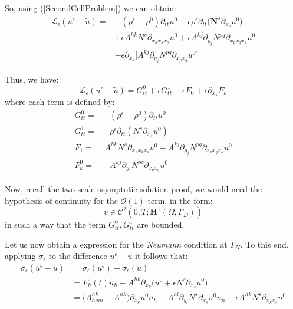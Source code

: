 So, using (\ref{SecondCellProblem}) we can obtain:
\begin{align*}
    \mathcal{L}_{\epsilon} (u^{\epsilon} -\tilde{u})  = & - (\rho^{\epsilon}-\rho^0) \partial_{tt} u^0 - \epsilon \rho^{\epsilon} \partial_{tt}\big(\mathbf{N}^s \partial_{x_s}u^0 \big)  \\
    & + \epsilon A^{hk} N^s \partial_{x_h x_k x_s} u^0 + \epsilon A^{kj} \partial_{y_j} N^{pq} \partial_{x_p x_q x_k} u^0  \\
    & - \epsilon \partial_{x_k} \big[ A^{kj} \partial_{y_j} N^{pq} \partial_{x_p x_q} u^0\big] 
\end{align*}

Thus, we have:
\begin{equation}
    \mathcal{L}_{\epsilon} (u^{\epsilon}-\tilde{u}) = G_{tt}^0 + \epsilon G_{tt}^1 + \epsilon F_0 + \epsilon \partial_{x_k} F_k
\end{equation}
where each term is defined by:
\begin{equation}
    \label{Variables}
    \begin{aligned}
        G_{tt}^0 = & -(\rho^{\epsilon} - \rho^0) \partial_{tt}u^0 \\
        G_{tt}^1 = & -\rho^{\epsilon} \partial_{tt}(N^s \partial_{x_s} u^0) \\
        F_1 = & \, A^{hk}N^s \partial_{x_h x_k x_s} u^0  + A^{kj}\partial_{y_j} N^{pq} \partial_{x_p x_q x_k} u^0 \\
        F^0_k = & - A^{kj} \partial_{y_j} N^{pq} \partial_{x_p x_q} u^0 
    \end{aligned}
\end{equation}

\begin{rem}
Now, recall the two-scale asymptotic solution proof, we would need the hypothesis of continuity for the $\mathcal{O}(1)$ term, in the form:
\begin{equation*}
    v \in \mathcal{C}^2(0,T; \mathbf{H}^1(\Omega, \Gamma_D))
\end{equation*}
in such a way that the term $G^0_{tt}, G_{tt}^1$ are bounded.
\end{rem}

Let us now obtain a expression for the \textit{Neumann} condition at $\Gamma_N$. To this end, applying $\sigma_{\epsilon}$ to the difference $u^{\epsilon} - \tilde{u}$ it follows that:
\begin{align*}
    \sigma_{\epsilon} (u^{\epsilon} - \tilde{u}) & =  \sigma_{\epsilon}(u^{\epsilon}) - \sigma_{\epsilon} (\tilde{u}) \\
    & = F_h(t) n_h - A^{hk} \partial_{x_k} \big( u^0 + \epsilon N^s \partial_{x_s}u^0 \big) \\
    & = \big(A^{hk}_{hom} - A^{hk} \big) \partial_{x_k} u^0 n_h - A^{hl} \partial_{y_l} N^s \partial_{x_s} u^0 n_h - \epsilon A^{hk} N^s \partial_{x_k x_s} u^0 
\end{align*}

